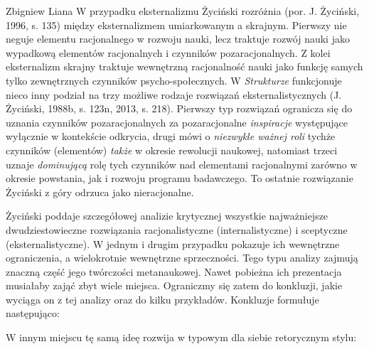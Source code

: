 \begin{artplenv}{Zbigniew Liana}
W przypadku eksternalizmu Życiński rozróżnia \label{ref:RNDAJVAwcgRgv}(por. J. Życiński, 1996, s. 135) między
eksternalizmem umiarkowanym a skrajnym. Pierwszy nie neguje elementu racjonalnego w rozwoju nauki, lecz traktuje rozwój
nauki jako wypadkową elementów racjonalnych i czynników pozaracjonalnych. Z kolei eksternalizm skrajny traktuje
wewnętrzną racjonalność nauki jako funkcję samych tylko zewnętrznych czynników psycho-społecznych. W \textit{Strukturze}
funkcjonuje nieco inny podział na trzy możliwe rodzaje rozwiązań eksternalistycznych \label{ref:RNDcwjdYvX9ov}(J.
Życiński, 1988b, s. 123n, 2013, s. 218). Pierwszy typ rozwiązań ogranicza się do uznania czynników pozaracjonalnych za
pozaracjonalne \textit{inspiracje} występujące wyłącznie w kontekście odkrycia, drugi mówi o \textit{niezwykle ważnej roli}
tychże czynników (elementów) \textit{także} w okresie rewolucji naukowej, natomiast trzeci uznaje \textit{dominującą} rolę
tych czynników nad elementami racjonalnymi zarówno w okresie powstania, jak i rozwoju programu badawczego. To ostatnie
rozwiązanie Życiński z góry odrzuca jako nieracjonalne.

Życiński poddaje szczegółowej analizie krytycznej wszystkie najważniejsze dwudziestowieczne rozwiązania racjonalistyczne
(internalistyczne) i sceptyczne (eksternalistyczne). W jednym i drugim przypadku pokazuje ich wewnętrzne ograniczenia,
a wielokrotnie wewnętrzne sprzeczności. Tego typu analizy zajmują znaczną część jego twórczości metanaukowej. Nawet
pobieżna ich prezentacja musiałaby zająć zbyt wiele miejsca. Ograniczmy się zatem do konkluzji, jakie wyciąga on z tej
analizy oraz do kilku przykładów. Konkluzje formułuje następująco:

W innym miejscu tę samą ideę rozwija w typowym dla siebie retorycznym stylu:


\end{artplenv}

